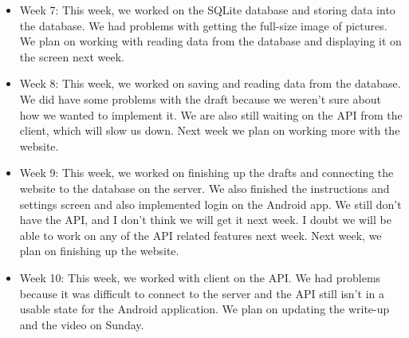 \documentclass[onecolumn, draftclsnofoot,10pt, compsoc]{IEEEtran}
\begin{document}
\begin{itemize}
     \item Week 7: This week, we worked on the SQLite database and storing data into the database. We had problems with getting the full-size image of pictures. We plan on working with reading data from the database and displaying it on the screen next week.
     
     \item Week 8: This week, we worked on saving and reading data from the database. We did have some problems with the draft because we weren't sure about how we wanted to implement it. We are also still waiting on the API from the client, which will slow us down. Next week we plan on working more with the website.
     
     \item Week 9: This week, we worked on finishing up the drafts and connecting the website to the database on the server. We also finished the instructions and settings screen and also implemented login on the Android app. We still don't have the API, and I don't think we will get it next week. I doubt we will be able to work on any of the API related features next week. Next week, we plan on finishing up the website.
     
     \item Week 10: This week, we worked with client on the API. We had problems because it was difficult to connect to the server and the API still isn't in a usable state for the Android application. We plan on updating the write-up and the video on Sunday.
 \end{itemize}
\end{document}
